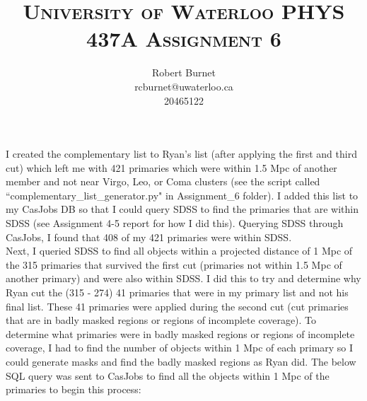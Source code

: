 \documentclass[10pt,letterpaper]{article}
\begin{document}
\title{\scshape\LARGE University of Waterloo \vfill \huge\bfseries PHYS 437A Assignment 6 \vfill}
\author{Robert Burnet \\ rcburnet@uwaterloo.ca \\ 20465122 }
\maketitle

\newpage



I created the complementary list to Ryan's list (after applying the first and third cut) which left me with 421 primaries which were within 1.5 Mpc of another member and not near Virgo, Leo, or Coma clusters (see the script called ``complementary\_list\_generator.py" in Assignment\_6 folder). I added this list to my CasJobs DB so that I could query SDSS to find the primaries that are within SDSS (see Assignment 4-5 report for how I did this). Querying SDSS through CasJobs, I found that 408 of my 421 primaries were within SDSS. \\

Next, I queried SDSS to find all objects within a projected distance of 1 Mpc of the 315 primaries that survived the first cut (primaries not within 1.5 Mpc of another primary) and were also within SDSS. I did this to try and determine why Ryan cut the (315 - 274) 41 primaries that were in my primary list and not his final list. These 41 primaries were applied during the second cut (cut primaries that are in badly masked regions or regions of incomplete coverage). To determine what primaries were in badly masked regions or regions of incomplete coverage, I had to find the number of objects within 1 Mpc of each primary so I could generate masks and find the badly masked regions as Ryan did. The below SQL query was sent to CasJobs to find all the objects within 1 Mpc of the primaries to begin this process:\\
\end{document}
